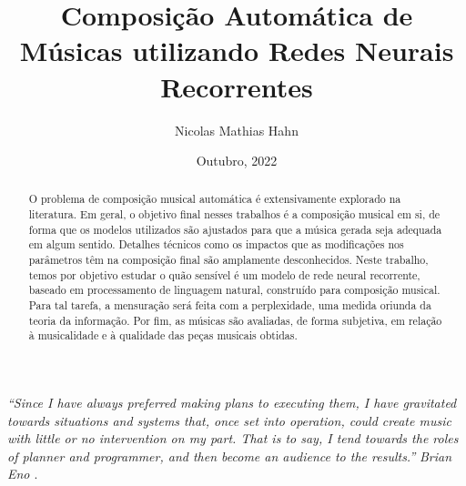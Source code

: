 \documentclass[twoside]{automatextcc}
\begin{document}
\title{Composição Automática de Músicas utilizando Redes Neurais Recorrentes}
\author{Nicolas Mathias Hahn}



\dept{\DEST}

\date{Outubro, 2022}


\maketitulo

\makefolhaderosto

\makefolhadeaprovacaoA %


\newpage
\vspace*{\fill}
\begin{flushright} %
	\textit{``Since I have always preferred making plans to executing them, I have gravitated towards situations and systems that, once set into operation, could create music with little or no intervention on my part. That is to say, I tend towards the roles of planner and programmer, and then become an audience to the results.''} \newline
	\textit{Brian Eno \citep{alpern1995}}.
\end{flushright}



\begin{abstract}
O problema de composição musical automática é extensivamente  explorado na literatura. Em geral, o objetivo final nesses trabalhos é a composição musical em si, de forma que os modelos utilizados são ajustados para que a música gerada seja adequada em algum sentido. Detalhes técnicos como os impactos que as modificações nos parâmetros têm na composição final são amplamente desconhecidos. Neste trabalho, temos por objetivo estudar o quão sensível é um modelo de rede neural recorrente, baseado em processamento de linguagem natural, construído para composição musical. Para tal tarefa, a mensuração será feita com a perplexidade, uma medida oriunda da teoria da informação. Por fim, as músicas são avaliadas, de forma subjetiva, em relação à musicalidade e à qualidade das peças musicais obtidas.
\end{abstract}
\end{document}
